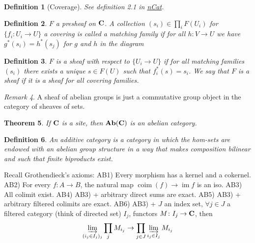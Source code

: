 \documentclass[A4paper, british]{amsart}
\theoremstyle{darkgreentheorem}
\newtheorem{thm}{Theorem}[section]
\theoremstyle{darkbluedefinition}
\newtheorem{defn}[thm]{Definition}
\theoremstyle{darkredexample}
\theoremstyle{remark}
\newtheorem{rem}[thm]{Remark}
\DeclareMathOperator{\im}{im}
\newcommand{\1}{\mathbbm{1}}
\begin{document}
\begin{defn}[Coverage]
    See definition 2.1 in \href{https://ncatlab.org/nlab/show/coverage}{nCat}.
\end{defn}

\begin{defn}
    $F$ a presheaf on $\mathbf{C}$.
    A collection $(s_{i})\in \prod_{i}F(U_{i})$ for $\{f_{i}\colon U_{i}\to U\}$ a covering is called a \textit{matching family} if for all $h\colon V\to U$ we have $g^{*}(s_{i})=h^{*}(s_{j})$ for $g$ and $h$ in the diagram
    \begin{center}
    \end{center}
\end{defn}

\begin{defn}
    $F$ is a sheaf with respect to $\{U_{i}\to U\}$ if for all matching families $(s_{i})$ there exists a unique $s\in F(U)$ such that $f_{i}^{*}(s)=s_{i}$.
    We say that $F$ is a \textit{sheaf} if it is a sheaf for all covering families.
\end{defn}

\begin{rem}
    A sheaf of abelian groups is just a commutative group object in the category of sheaves of sets.
\end{rem}

\begin{thm}
    If $\mathbf{C}$ is a site, then $\mathbf{Ab}(\mathbf{C})$ is an abelian category.
\end{thm}

\begin{defn}
    An additive category is a category in which the hom-sets are endowed with an abelian group structure in a way that makes composition bilinear and such that finite biproducts exist.
\end{defn}

Recall Grothendieck's axioms:
AB1) Every morphism has a kernel and a cokernel.
AB2) For every $f\colon A\to B$, the natural map $\operatorname{coim}(f)\to \im{f}$ is an iso.
AB3) All colimit exist.
AB4) AB3) + arbitrary direct sums are exact.
AB5) AB3) + arbitrary filtered colimits are exact.
AB6) AB3) + $J$ an index set, $\forall j\in J$ a filtered category (think of directed set) $I_{j}$, functors $M\colon I_{j}\to \mathbf{C}$, then
\[\varinjlim_{(i_{j}\in I_{j})_{j}}\prod_{j} M_{i_{j}}\to \prod_{j\in J}\varinjlim_{i_{j}\in I_{j}} M_{i_{j}} \]
\end{document}
